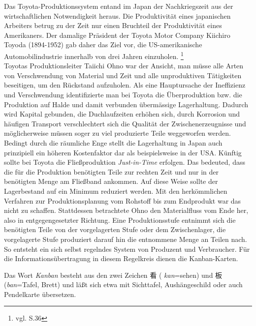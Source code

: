 Das Toyota-Produktionssystem entand im Japan der Nachkriegszeit 
aus der wirtschaftlichen Notwendigkeit heraus. 
Die Produktivität eines japanischen Arbeiters betrug zu der Zeit nur einen Bruchteil der Produktivität eines Amerikaners. 
Der damalige Präsident der Toyota Motor Company Kiichiro Toyoda (1894-1952) gab daher das Ziel vor, 
die US-amerikanische Automobilindustrie innerhalb von drei Jahren  einzuholen. \footnote{vgl. \cite{Ohno2013TPS} S.36}\\
Toyotas Produktionsleiter Taiichi Ohno war der Ansicht, man müsse alle Arten von 
Verschwendung von Material und Zeit und alle unproduktiven Tätigkeiten 
beseitigen, um den Rückstand aufzuholen. Als eine Hauptursache der Ineffizienz 
und Verschwendung identifizierte man bei Toyota die Überproduktion bzw. die Produktion auf 
Halde und damit verbunden übermässige Lagerhaltung. Dadurch wird Kapital gebunden, 
die Duchlaufzeiten erhöhen sich, durch Korrosion und häufigen Transport verschlechtert
sich die Qualität der Zwischenerzeugnisse und möglicherweise müssen soger zu viel
produzierte Teile weggeworfen werden. Bedingt durch die räumliche Enge stellt die 
Lagerhaltung in Japan auch prinzipiell ein höheren Kostenfaktor dar als beispielsweise in der USA.
Künftig sollte bei Toyota die Fließproduktion \emph{Just-in-Time} erfolgen. 
Das bedeuted, dass die für die Produktion benötigten Teile zur rechten Zeit und 
nur in der benötigten Menge am Fließband ankommen.
Auf diese Weise sollte der Lagerbestand auf ein Minimum reduziert werden.
Mit den herkömmlichen Verfahren zur Produktionsplanung vom Rohstoff 
bis zum Endprodukt war das nicht zu schaffen.
Stattdessen betrachtete Ohno den Materialfluss vom Ende her, also in entgegengesetzter Richtung.
Eine Produktionsstufe entnimmt sich die benötigten Teile von der vorgelagerten Stufe oder dem Zwischenlager,
die vorgelagerte Stufe produziert darauf hin die entnommene Menge an Teilen nach.
So entsteht ein sich selbst regelndes System von Produzent und Verbraucher.
Für die Informationsübertragung in diesem Regelkreis dienen die Kanban-Karten.

Das Wort \emph{Kanban} besteht aus den zwei Zeichen {\CN 看} ( \emph{kan}=sehen)
 und {\CN 板} (\emph{ban}=Tafel, Brett) und läßt sich etwa mit Sichttafel, 
 Aushängeschild oder auch Pendelkarte übersetzen.

